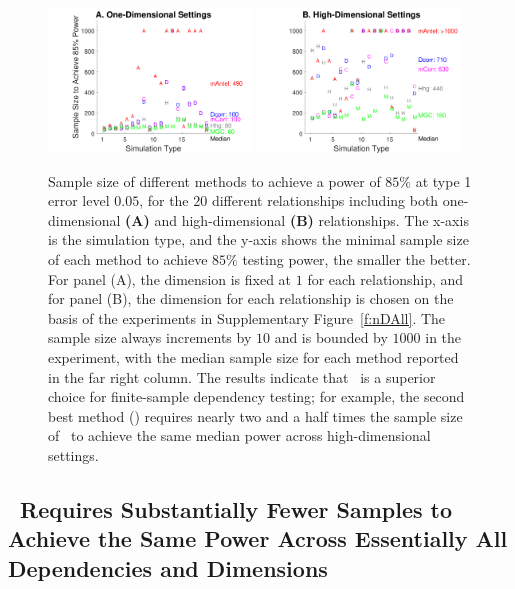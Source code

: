 \documentclass[11pt]{extarticle}
\begin{document}
\begin{figure}[!ht]
\centering
\includegraphics[width=0.48\textwidth,trim={1.5cm 0 0cm 0cm},clip]{Figures/Fig1DPowerSummarySize}
\includegraphics[width=0.48\textwidth,trim={1.5cm 0 0cm 0cm},clip]{Figures/FigHDPowerSummarySize}
  \caption{
Sample size of different methods to achieve a power of $85\%$ at type 1 error level $0.05$, for the $20$ different relationships including both one-dimensional \textbf{(A)} and high-dimensional \textbf{(B)} relationships.
The x-axis is the simulation type, and the y-axis shows the minimal sample size of each method to achieve $85\%$ testing power, the smaller the better.
For panel (A), the dimension is fixed at $1$ for each relationship,
and for panel (B), the dimension for each relationship is chosen on the basis of the experiments in Supplementary Figure~\ref{f:nDAll}.
The sample size always increments by $10$ and is bounded by $1000$ in the experiment, with the median sample size for each method reported in the far right column. The results indicate that \Mgc~is a superior choice for finite-sample dependency testing; for example,  the second best method (\Hhg) requires nearly two and a half times the sample size of \Mgc~to achieve the same median power across high-dimensional settings.}
\label{f:Summary}
\end{figure}

\subsection*{\Mgc~Requires Substantially Fewer Samples to Achieve the Same Power Across Essentially All Dependencies and Dimensions}
\end{document}
